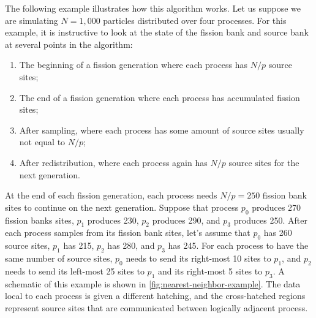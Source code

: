 The following example illustrates how this algorithm works. Let us suppose we
are simulating $N = 1,000$ particles distributed over four processes. For this
example, it is instructive to look at the state of the fission bank and source
bank at several points in the algorithm:
\begin{enumerate}
\item The beginning of a fission generation where each process has $N/p$ source
  sites;
\item The end of a fission generation where each process has accumulated fission
  sites;
\item After sampling, where each process has some amount of source sites usually
  not equal to $N/p$;
\item After redistribution, where each process again has $N/p$ source sites for
  the next generation.
\end{enumerate}
At the end of each fission generation, each process needs $N/p = 250$ fission
bank sites to continue on the next generation. Suppose that process $p_0$
produces 270 fission banks sites, $p_1$ produces 230, $p_2$ produces 290, and
$p_3$ produces 250. After each process samples from its fission bank sites,
let's assume that $p_0$ has 260 source sites, $p_1$ has 215, $p_2$ has 280, and
$p_3$ has 245. For each process to have the same number of source sites, $p_0$
needs to send its right-most 10 sites to $p_1$, and $p_2$ needs to send its
left-most 25 sites to $p_1$ and its right-most 5 sites to $p_3$. A schematic of
this example is shown in \autoref{fig:nearest-neighbor-example}. The data local
to each process is given a different hatching, and the cross-hatched regions
represent source sites that are communicated between logically adjacent process.
